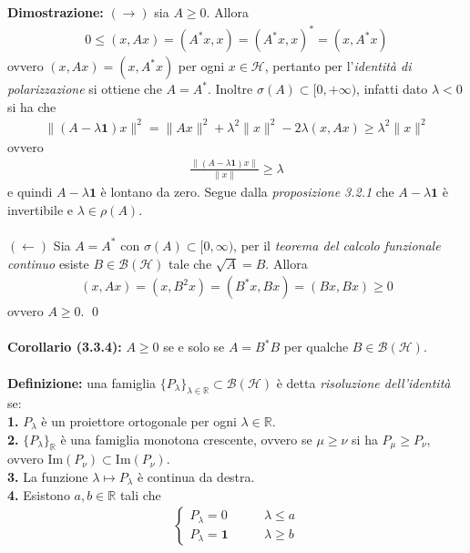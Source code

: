 \documentclass{article}
\numberwithin{equation}{subsection}
\begin{document}
\textbf{Dimostrazione:} $(\rightarrow)$ sia $A \geq 0$. Allora 
\begin{align*}
    0 \leq (x, Ax) = (A^*x, x) = (A^*x, x)^* = (x, A^*x) 
\end{align*}
ovvero $(x, Ax) = (x, A^*x)$ per ogni $x \in \mathcal{H}$, pertanto per l'\textit{identità di polarizzazione} si ottiene che $A = A^*$. Inoltre $\sigma(A) \subset [0, +\infty)$, infatti dato $\lambda < 0$ si ha che 
\begin{align*}
    \|(A - \lambda\mathbf{1})x\|^2 = \|Ax\|^2 + \lambda^2\|x\|^2 - 2\lambda(x, Ax) \geq \lambda^2\|x\|^2 
\end{align*}
ovvero 
\begin{align*}
    \frac{\|(A - \lambda\mathbf{1})x\|}{\|x\|} \geq \lambda 
\end{align*}
e quindi $A - \lambda\mathbf{1}$ è lontano da zero. Segue dalla \textit{proposizione 3.2.1} che $A - \lambda\mathbf{1}$ è invertibile e $\lambda \in \rho(A)$. \\ \\
$(\leftarrow)$ Sia $A = A^*$ con $\sigma(A) \subset [0, \infty)$, per il \textit{teorema del calcolo funzionale continuo} esiste $B \in \mathcal{B}(\mathcal{H})$ tale che $\sqrt{A} = B$. Allora 
\begin{align*}
    (x, Ax) = (x, B^2x) = (B^*x, Bx) = (Bx, Bx) \geq 0 
\end{align*}
ovvero $A \geq 0$. \qed \\ \\
\textbf{Corollario (3.3.4):} $A \geq 0$ se e solo se $A = B^*B$ per qualche $B \in \mathcal{B}(\mathcal{H})$. \\ \\
\textbf{Definizione:} una famiglia $\{P_\lambda\}_{\lambda \in \mathbb{R}} \subset \mathcal{B}(\mathcal{H})$ è detta \textit{risoluzione dell'identità} se: \\
\textbf{1.} $P_\lambda$ è un proiettore ortogonale per ogni $\lambda \in \mathbb{R}$. \\
\textbf{2.} $\{P_\lambda\}_{\mathbb{R}}$ è una famiglia monotona crescente, ovvero se $\mu \geq \nu$ si ha $P_\mu \geq P_\nu$, ovvero $\mathrm{Im}(P_\nu) \subset \mathrm{Im}(P_\nu)$. \\
\textbf{3.} La funzione $\lambda \mapsto P_\lambda$ è continua da destra. \\
\textbf{4.} Esistono $a, b \in \mathbb{R}$ tali che
\begin{align*}
    \begin{cases}
        P_\lambda = 0 \qquad &\lambda \leq a \\
        P_\lambda = \mathbf{1} \qquad &\lambda \geq b
    \end{cases} 
\end{align*}
\end{document}
